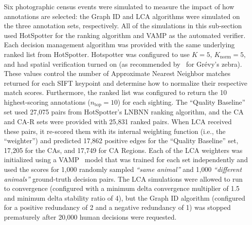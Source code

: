 Six photographic census events were simulated to measure the impact of how annotations are selected: the Graph ID and LCA algorithms were simulated on the three annotation sets, respectively.  All of the simulations in this sub-section used HotSpotter for the ranking algorithm and VAMP as the automated verifier.  Each decision management algorithm was provided with the same underlying ranked list from HotSpotter.  Hotspotter was configured to use $K=5$, $K_{\text{norm}}=5$, and had spatial verification turned on (as recommended by~\cite{crall_identifying_2017} for Gr\'evy's zebra).  These values control the number of Approximate Nearest Neighbor matches returned for each SIFT keypoint and determine how to normalize their respective match scores.  Furthermore, the ranked list was configured to return the 10 highest-scoring annotations ($n_{\text{top}}=10$) for each sighting.  The ``Quality Baseline'' set used 27,075 pairs from HotSpotter's LNBNN ranking algorithm, and the CA and CA-R sets were provided with 25,831 ranked pairs.  When LCA received these pairs, it re-scored them with its internal weighting function (i.e., the ``weighter'') and predicted 17,862 positive edges for the ``Quality Baseline'' set, 17,205 for the CAs, and 17,749 for CA Regions.  Each of the LCA weighters was initialized using a VAMP~\cite{crall_identifying_2017} model that was trained for each set independently and used the scores for 1,000 randomly sampled \textit{``same animal''} and 1,000 \textit{``different animals''} ground-truth decision pairs.  The LCA simulations were allowed to run to convergence (configured with a minimum delta convergence multiplier of 1.5 and minimum delta stability ratio of 4), but the Graph ID algorithm (configured for a positive redundancy of 2 and a negative redundancy of 1) was stopped prematurely after 20,000 human decisions were requested.

